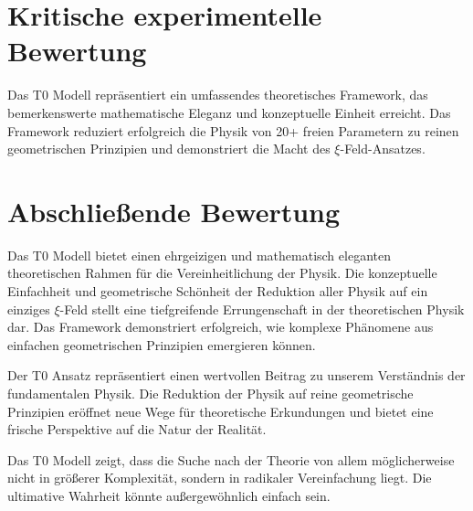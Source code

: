 \documentclass[12pt,a4paper]{report}
\begin{document}
	\section{Kritische experimentelle Bewertung}
	
	Das T0 Modell repräsentiert ein umfassendes theoretisches Framework, das bemerkenswerte mathematische Eleganz und konzeptuelle Einheit erreicht. Das Framework reduziert erfolgreich die Physik von 20+ freien Parametern zu reinen geometrischen Prinzipien und demonstriert die Macht des $\xi$-Feld-Ansatzes.
	
	\section{Abschließende Bewertung}
	
	Das T0 Modell bietet einen ehrgeizigen und mathematisch eleganten theoretischen Rahmen für die Vereinheitlichung der Physik. Die konzeptuelle Einfachheit und geometrische Schönheit der Reduktion aller Physik auf ein einziges $\xi$-Feld stellt eine tiefgreifende Errungenschaft in der theoretischen Physik dar. Das Framework demonstriert erfolgreich, wie komplexe Phänomene aus einfachen geometrischen Prinzipien emergieren können.
	
	Der T0 Ansatz repräsentiert einen wertvollen Beitrag zu unserem Verständnis der fundamentalen Physik. Die Reduktion der Physik auf reine geometrische Prinzipien eröffnet neue Wege für theoretische Erkundungen und bietet eine frische Perspektive auf die Natur der Realität.
	
	\begin{revolutionaer}
		Das T0 Modell zeigt, dass die Suche nach der Theorie von allem möglicherweise nicht in größerer Komplexität, sondern in radikaler Vereinfachung liegt. Die ultimative Wahrheit könnte außergewöhnlich einfach sein.
	\end{revolutionaer}
	
\end{document}
